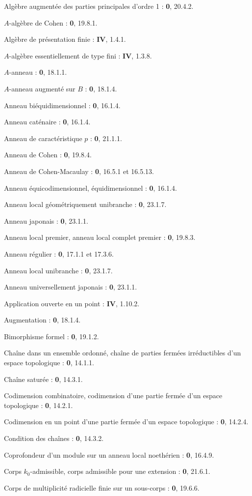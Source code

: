 Algèbre augmentée des parties principales d'ordre 1 : \textbf{0}, 20.4.2.\par
$A$-algèbre de Cohen : \textbf{0}, 19.8.1.\par
Algèbre de présentation finie : \textbf{IV}, 1.4.1.\par
$A$-algèbre essentiellement de type fini : \textbf{IV}, 1.3.8.\par
$A$-anneau : \textbf{0}, 18.1.1.\par
$A$-anneau augmenté sur $B$ : \textbf{0}, 18.1.4.\par
Anneau biéquidimensionnel : \textbf{0}, 16.1.4.\par
Anneau caténaire : \textbf{0}, 16.1.4.\par
Anneau de caractéristique $p$ : \textbf{0}, 21.1.1.\par
Anneau de Cohen : \textbf{0}, 19.8.4.\par
Anneau de Cohen-Macaulay : \textbf{0}, 16.5.1 et 16.5.13.\par
Anneau équicodimensionnel, équidimensionnel : \textbf{0}, 16.1.4.\par
Anneau local géométriquement unibranche : \textbf{0}, 23.1.7.\par
Anneau japonais : \textbf{0}, 23.1.1.\par
Anneau local premier, anneau local complet premier : \textbf{0}, 19.8.3.\par
Anneau régulier : \textbf{0}, 17.1.1 et 17.3.6.\par
Anneau local unibranche : \textbf{0}, 23.1.7.\par
Anneau universellement japonais : \textbf{0}, 23.1.1.\par
Application ouverte en un point : \textbf{IV}, 1.10.2.\par
Augmentation : \textbf{0}, 18.1.4.\par

Bimorphisme formel : \textbf{0}, 19.1.2.\par

Chaîne dans un ensemble ordonné, chaîne de parties fermées irréductibles d'un espace topologique : \textbf{0}, 14.1.1.\par
Chaîne saturée : \textbf{0}, 14.3.1.\par
Codimension combinatoire, codimension d'une partie fermée d'un espace topologique : \textbf{0}, 14.2.1.\par
Codimension en un point d'une partie fermée d'un espace topologique : \textbf{0}, 14.2.4.\par
Condition des chaînes : \textbf{0}, 14.3.2.\par
Coprofondeur d'un module sur un anneau local noethérien : \textbf{0}, 16.4.9.\par
Corps $k_0$-admissible, corps admissible pour une extension : \textbf{0}, 21.6.1.\par
Corps de multiplicité radicielle finie sur un sous-corps : \textbf{0}, 19.6.6.\par

